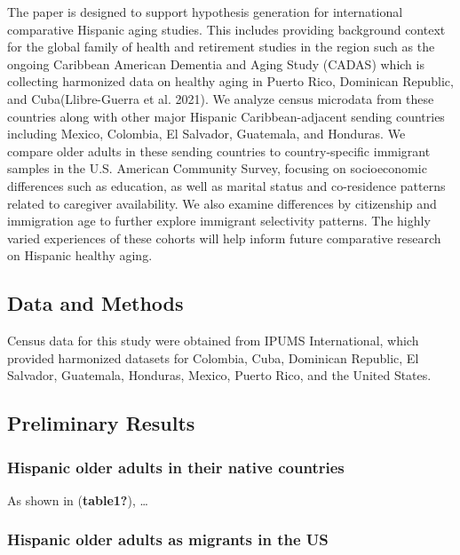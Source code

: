 \documentclass[
]{article}
\begin{document}
The paper is designed to support hypothesis generation for international
comparative Hispanic aging studies. This includes providing background
context for the global family of health and retirement studies in the
region such as the ongoing Caribbean American Dementia and Aging Study
(CADAS) which is collecting harmonized data on healthy aging in Puerto
Rico, Dominican Republic, and Cuba(Llibre-Guerra et al. 2021). We
analyze census microdata from these countries along with other major
Hispanic Caribbean-adjacent sending countries including Mexico,
Colombia, El Salvador, Guatemala, and Honduras. We compare older adults
in these sending countries to country-specific immigrant samples in the
U.S. American Community Survey, focusing on socioeconomic differences
such as education, as well as marital status and co-residence patterns
related to caregiver availability. We also examine differences by
citizenship and immigration age to further explore immigrant selectivity
patterns. The highly varied experiences of these cohorts will help
inform future comparative research on Hispanic healthy aging.

\subsection{Data and Methods}\label{data-and-methods}

Census data for this study were obtained from IPUMS International, which
provided harmonized datasets for Colombia, Cuba, Dominican Republic, El
Salvador, Guatemala, Honduras, Mexico, Puerto Rico, and the United
States.

\subsection{Preliminary Results}\label{preliminary-results}

\subsubsection{Hispanic older adults in their native
countries}\label{hispanic-older-adults-in-their-native-countries}

As shown in (\textbf{table1?}), \ldots{}

\newpage

\subsubsection{Hispanic older adults as migrants in the
US}\label{hispanic-older-adults-as-migrants-in-the-us}
\end{document}

